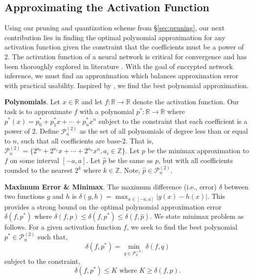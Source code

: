 \documentclass[conference]{IEEEtran}
\begin{document}
\subsection{Approximating the Activation Function}\label{sec:approx_activation}

Using our pruning and quantization scheme from \S\ref{sec:pruning}, our next contribution lies in finding the optimal polynomial approximation for any activation function given the constraint that the coefficients must be a power of 2.
The activation function of a neural network is critical for convergence \cite{glorot2011deep} and has been thoroughly explored in literature \cite{ramachandran2017swish}.
With the goal of encrypted network inference, we must find an approximation which balances approximation error with practical usability.
Inspired by \cite{brisebarre2006computing}, we find the best polynomial approximation.

\textbf{Polynomials}. Let $x \in \mathbb{R}$ and let $f: \mathbb{R} \rightarrow \mathbb{R}$ denote the activation function.
Our task is to approximate $f$ with a polynomial $p^*: \mathbb{R} \rightarrow \mathbb{R}$ where $p^*(x) = p^*_0 + p_1^* x + \cdots + p^*_n x^n$ subject to the constraint that each coefficient is a power of 2.
Define $\mathcal{P}^{(2)}_n$ as the set of all polynomials of degree less than or equal to $n$, such that all coefficients are base-2.
That is, $\mathcal{P}^{(2)}_n = \{  2^{a_0} + 2^{a_1} x + \cdots + 2^{a_n} x^n , a_i \in \mathbb{Z} \}$.
Let $p$ be the minimax approximation to $f$ on some interval $[-a, a]$.
Let $\hat{p}$ be the same as $p$, but with all coefficients rounded to the nearest $2^k$ where $k \in \mathbb{Z}$.
Note, $\hat{p} \in \mathcal{P}^{(2)}_n$.

\textbf{Maximum Error \& Minimax}. The maximum difference (i.e., error) $\delta$ between two functions $g$ and $h$ is $\delta(g, h) = \max_{x\in [-a,a]} | g(x) - h(x) |$.
This provides a strong bound on the optimal polynomial approximation error $\delta(f, p^*)$ where $\delta(f, p) \leq \delta(f, p^*) \leq \delta(f, \hat{p}).$
We state minimax problem as follows. For a given activation function $f$, we seek to find the best polynomial $p^* \in \mathcal{P}^{(2)}_n$ such that,
\begin{equation}
    \delta(f, p^*) = \min_{q \in \mathcal{P}^{(2)}_n} \delta(f, q)
\end{equation}
subject to the constraint,
\begin{equation}\label{eq:constraint}
    \delta(f, p^*) \leq K \textrm{ where } K \geq \delta(f, p).
\end{equation}
\end{document}
